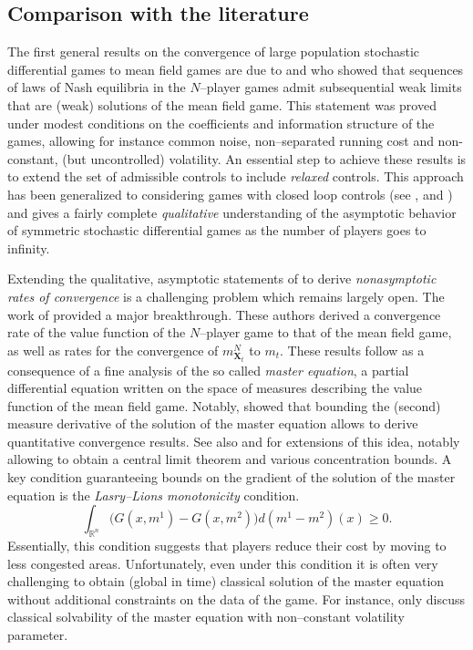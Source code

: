 \documentclass[11pt,reqno]{amsart}
\numberwithin{equation}{section}
\theoremstyle{definition}
\def\R{{\mathbb R}}
\newcommand{\bX}{\mathbf{X}}
\def \R{\mathbb{R}}
\begin{document}
\subsection{Comparison with the literature} 
\label{subec:comparison}
The first general results on the convergence of large population stochastic differential games to mean field games are due to \citet{lacker2016general} and \citet{fischer2017connection} who showed that sequences of laws of Nash equilibria in the $N$--player games admit subsequential weak limits that are (weak) solutions of the mean field game.
This statement was proved under modest conditions on the coefficients and information structure of the games, allowing for instance common noise, non--separated running cost and non-constant, (but uncontrolled) volatility.
An essential step to achieve these results is to extend the set of admissible controls to include \emph{relaxed} controls.
This approach has been generalized to considering games with closed loop controls (see \citet{Lac-LeFlem2023,lacker2020convergence}, \citet{Djete21} and \citet{Iseri-Zhang21})
and gives a fairly complete \emph{qualitative} understanding of the asymptotic behavior of symmetric stochastic differential games as the number of players goes to infinity.

Extending the qualitative, asymptotic statements of \cite{Djete21,fischer2017connection,lacker2016general,lacker2020convergence,Lac-LeFlem2023} to derive \emph{nonasymptotic rates of convergence} is a challenging problem which remains largely open.
The work of \citet{cardaliaguet2019master} provided a major breakthrough.
These authors derived a convergence rate of the value function of the $N$--player game to that of the mean field game, as well as rates for the convergence of $m^N_{\bX_t}$ to $m_t$.
These results follow as a consequence of a fine analysis of the so called \emph{master equation}, a partial differential equation written on the space of measures describing the value function of the mean field game.
Notably, \citet{cardaliaguet2019master} showed that bounding the (second) measure derivative of the solution of the master equation allows to derive quantitative convergence results.
See also \citet{Card17} and \citet{delarue2020master,delarue2019master} for extensions of this idea, notably allowing to obtain a central limit theorem and various concentration bounds.
A key condition guaranteeing bounds on the gradient of the solution of the master equation is the \emph{Lasry--Lions monotonicity} condition.
\begin{equation*}
  \int_{\R^n}\big(G(x,m^1) - G(x,m^2)\big)d(m^1 -m^2)(x)\ge0.
\end{equation*}
Essentially, this condition suggests that players reduce their cost by moving to less congested areas.
Unfortunately, even under this condition it is often very challenging to obtain (global in time) classical solution of the master equation without additional constraints on the data of the game.
For instance, only \citet{chassagneux2014probabilistic} discuss classical solvability of the master equation with non--constant volatility parameter.
\end{document}
